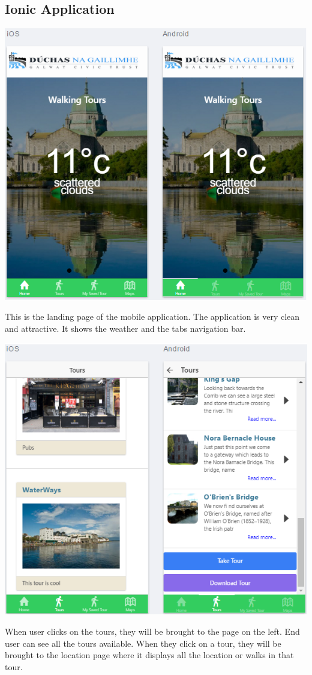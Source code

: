 		 \subsection{Ionic Application}
		 			\begin{center}    
		 				\includegraphics{img/LandingPage.png}
		 			\end{center}
		 			This is the landing page of the mobile application. The application is very clean and attractive. It shows the weather and the tabs navigation bar. 
		 			
		 				\begin{center}    
		 					\includegraphics{img/TourInfoTab.png}
		 				\end{center}
		 				When user clicks on the tours, they will be brought to the page on the left. End user can see all the tours available. When they click on a tour, they will be brought to the location page where it displays all the location or walks in that tour.
		 				
